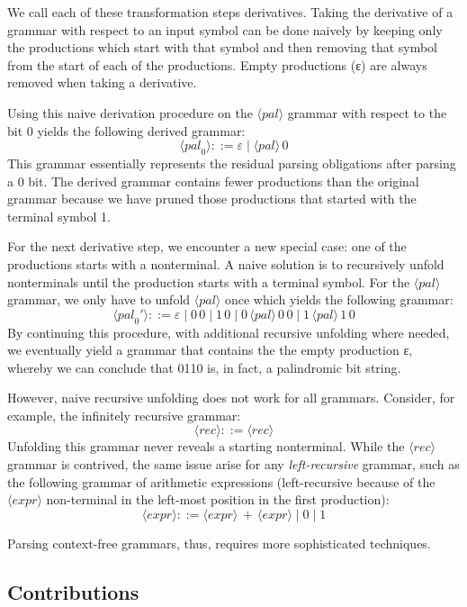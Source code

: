 We call each of these transformation steps derivatives.
Taking the derivative of a grammar with respect to an input symbol can be done naively by keeping only the productions which start with that symbol and then removing that symbol from the start of each of the productions.
Empty productions (ε) are always removed when taking a derivative.

Using this naive derivation procedure on the $\langle\mathit{pal}\rangle$ grammar with respect to the bit 0 yields the following derived grammar:
\[
\langle\mathit{pal}_0\rangle ::= ε \mid \langle\mathit{pal}\rangle\, 0
\]
This grammar essentially represents the residual parsing obligations after parsing a 0 bit.
The derived grammar contains fewer productions than the original grammar because we have pruned those productions that started with the terminal symbol 1.

For the next derivative step, we encounter a new special case: one of the productions starts with a nonterminal.
A naive solution is to recursively unfold nonterminals until the production starts with a terminal symbol.
For the $\langle\mathit{pal}\rangle$ grammar, we only have to unfold $\langle \mathit{pal} \rangle$ once which yields the following grammar:
\[
\langle\mathit{pal}_0'\rangle ::= ε \mid 0\, 0 \mid 1\, 0 \mid 0\, \langle\mathit{pal}\rangle\, 0\, 0 \mid 1\, \langle\mathit{pal}\rangle\, 1\, 0
\]
By continuing this procedure, with additional recursive unfolding where needed, we eventually yield a grammar that contains the the empty production ε, whereby we can conclude that 0110 is, in fact, a palindromic bit string.

However, naive recursive unfolding does not work for all grammars.
Consider, for example, the infinitely recursive grammar:
\[
\langle\mathit{rec}\rangle ::= \langle\mathit{rec}\rangle
\]
Unfolding this grammar never reveals a starting nonterminal.
While the $\langle\mathit{rec}\rangle$ grammar is contrived, the same issue arise for any \emph{left-recursive} grammar, such as the following grammar of arithmetic expressions (left-recursive because of the $\langle\mathit{expr}\rangle$ non-terminal in the left-most position in the first production):
\[
\langle\mathit{expr}\rangle ::= \langle\mathit{expr}\rangle\, +\, \langle\mathit{expr}\rangle \mid 0 \mid 1
\]

Parsing context-free grammars, thus, requires more sophisticated techniques.

\subsection{Contributions}

